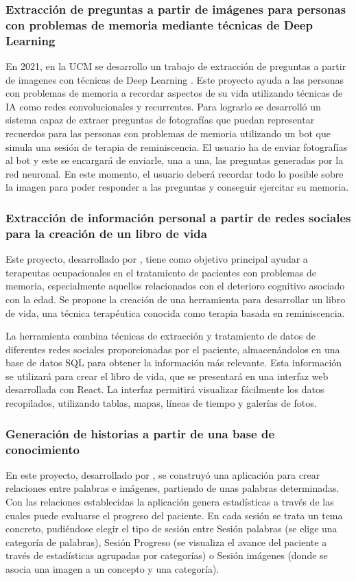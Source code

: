 \subsubsection{Extracción de preguntas a partir de imágenes para personas con problemas de memoria mediante técnicas de Deep Learning}
En 2021, en la UCM se desarrollo un trabajo de extracción de preguntas a partir de imagenes con técnicas de Deep Learning \cite{boto2021extraccion}. Este proyecto ayuda a las personas con problemas de memoria a recordar aspectos de su vida utilizando técnicas de IA como redes convolucionales y recurrentes. Para lograrlo se desarrolló un sistema capaz de extraer preguntas de fotografías que puedan representar recuerdos para las personas con problemas de memoria utilizando un bot que simula una sesión de terapia de reminiscencia.
El usuario ha de enviar fotografías al bot y este se encargará de enviarle, una a una, las preguntas generadas por la red neuronal. En este momento, el usuario deberá recordar todo lo posible sobre la imagen para poder responder a las preguntas y conseguir ejercitar su memoria.

\subsubsection{Extracción de información personal a partir de redes sociales para la creación de un libro de vida}
Este proyecto, desarrollado por \cite{aguilera2021extraccion}, tiene como objetivo principal ayudar a terapeutas ocupacionales en el tratamiento de pacientes con problemas de memoria, especialmente aquellos relacionados con el deterioro cognitivo asociado con la edad. Se propone la creación de una herramienta para desarrollar un libro de vida, una técnica terapéutica conocida como terapia basada en reminiscencia. 

La herramienta combina técnicas de extracción y tratamiento de datos de diferentes redes sociales proporcionadas por el paciente, almacenándolos en una base de datos SQL para obtener la información más relevante. Esta información se utilizará para crear el libro de vida, que se presentará en una interfaz web desarrollada con React. La interfaz permitirá visualizar fácilmente los datos recopilados, utilizando tablas, mapas, líneas de tiempo y galerías de fotos.

\subsubsection{Generación de historias a partir de una base de conocimiento}
En este proyecto, desarrollado por \cite{lucia_latorre_magaz}, se construyó una aplicación para crear relaciones entre palabras e imágenes,
partiendo de unas palabras determinadas. Con las relaciones establecidas la aplicación genera estadísticas a través de las cuales puede evaluarse el progreso del paciente. En cada sesión se trata un tema concreto, pudiéndose elegir el tipo de sesión entre Sesión palabras (se elige una categoría de palabras), Sesión Progreso (se visualiza el avance del paciente a través de estadísticas agrupadas por categorías) o Sesión imágenes (donde se asocia una imagen a un concepto y una categoría).
